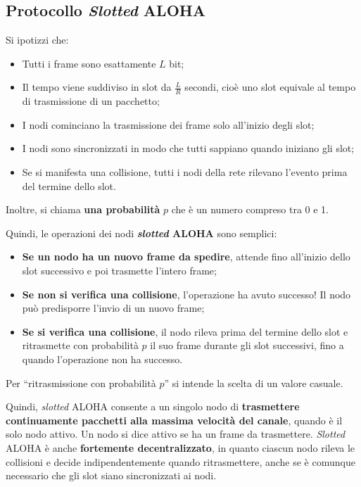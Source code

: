 \documentclass[a4paper]{article}
\newcommand{\dquotes}[1]{``#1''}
\begin{document}
	\subsection{Protocollo \emph{Slotted} ALOHA}
	
	Si ipotizzi che:
	\begin{itemize}[label=-]
		\item Tutti i frame sono esattamente $L$ bit;

		\item Il tempo viene suddiviso in slot da $\frac{L}{R}$ secondi, cioè uno slot equivale al tempo di trasmissione di un pacchetto;

		\item I nodi cominciano la trasmissione dei frame solo all’inizio degli slot;

		\item I nodi sono sincronizzati in modo che tutti sappiano quando iniziano gli slot;

		\item Se si manifesta una collisione, tutti i nodi della rete rilevano l’evento prima del termine dello slot.
	\end{itemize}
	Inoltre, si chiama \textbf{una probabilità} $p$ che è un numero compreso tra 0 e 1.\newline

	\noindent
	Quindi, le operazioni dei nodi \textcolor{Red3}{\textbf{\emph{slotted} ALOHA}} sono semplici:
	\begin{itemize}
		\item \textbf{Se un nodo ha un nuovo frame da spedire}, attende fino all'inizio dello slot successivo e poi trasmette l'intero frame;
		
		\item \textbf{Se non si verifica una collisione}, l'operazione ha avuto successo! Il nodo può predisporre l'invio di un nuovo frame;
		
		\item \textbf{Se si verifica una collisione}, il nodo rileva prima del termine dello slot e ritrasmette con probabilità $p$ il suo frame durante gli slot successivi, fino a quando l'operazione non ha successo.
	\end{itemize}
	Per \dquotes{ritrasmissione con probabilità $p$} si intende la scelta di un valore casuale.\newline
	
	\noindent
	Quindi, \emph{slotted} ALOHA consente a un singolo nodo di \textbf{trasmettere continuamente pacchetti alla massima velocità del canale}, quando è il solo nodo attivo. Un nodo si dice attivo se ha un frame da trasmettere. \emph{Slotted} ALOHA è anche \textbf{fortemente decentralizzato}, in quanto ciascun nodo rileva le collisioni e decide indipendentemente quando ritrasmettere, anche se è comunque necessario che gli slot siano sincronizzati ai nodi.
	
\end{document}
